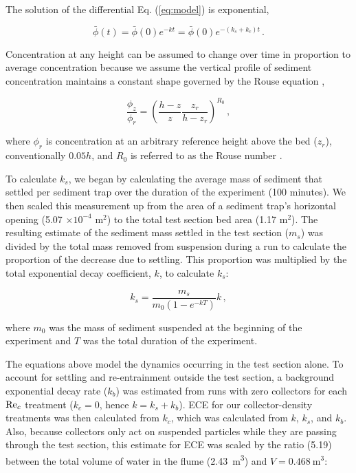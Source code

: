 \documentclass[geosciences,article,submit,moreauthors,pdftex]{Definitions/mdpi}
\begin{document}
The solution of the differential Eq. (\ref{eq:model}) is exponential,

\begin{equation}
    \bar{\phi}(t) = \bar{\phi}(0)e^{-kt} = \bar{\phi}(0)e^{-(k_s + k_c)t}\,.
    \label{eq:expo}    
\end{equation}

\noindent Concentration at any height can be assumed to change over time in proportion to average concentration because we assume the vertical profile of sediment concentration maintains a constant shape governed by the Rouse equation \cite{rouse1937modern},

\begin{equation}
    \frac{\phi_z}{\phi_r} = \left( \frac{h - z}{z} \frac{z_r}{h - z_r} \right)^{R_0}\,,
    \label{eq:rouse}    
\end{equation}

\noindent where $\phi_r$ is concentration at an arbitrary reference height above the bed ($z_r$), conventionally $0.05h$, and $R_0$ is referred to as the Rouse number \cite{kumbhakar2017derivation}.

To calculate $k_s$, we began by calculating the average mass of sediment that settled per sediment trap over the duration of the experiment (100 minutes). We then scaled this measurement up from the area of a sediment trap's horizontal opening (5.07 $\times 10^{-4}$ m$^2$) to the total test section bed area (1.17 m$^2$). The resulting estimate of the sediment mass settled in the test section ($m_s$) was divided by the total mass removed from suspension during a run to calculate the proportion of the decrease due to settling. This proportion was multiplied by the total exponential decay coefficient, $k$, to calculate $k_s$:

\begin{equation}
    k_s = \frac{m_s}{m_0(1-e^{-kT})}k\,,
    \label{eq:ks}
\end{equation}

\noindent where $m_0$ was the mass of sediment suspended at the beginning of the experiment and $T$ was the total duration of the experiment.

The equations above model the dynamics occurring in the test section alone. To account for settling and re-entrainment outside the test section, a background exponential decay rate ($k_b$) was estimated from runs with zero collectors for each $\mathrm{Re}_c$ treatment ($k_c = 0$, hence $k = k_s + k_b$). ECE for our collector-density treatments was then calculated from $k_c$, which was calculated from $k$, $k_s$, and $k_b$. Also, because collectors only act on suspended particles while they are passing through the test section, this estimate for ECE was scaled by the ratio (5.19) between the total volume of water in the flume (\SI{2.43}{\metre\cubed}) and $V = \SI{0.468}{\metre\cubed}$:
\end{document}
